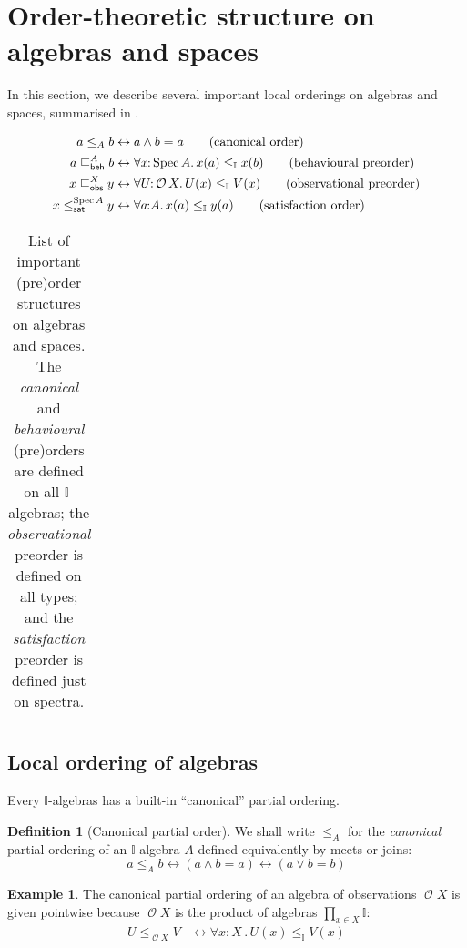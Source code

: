 \documentclass[a4paper,12pt]{amsart}
\theoremstyle{definition}
\newtheorem{example}[theorem]{Example}
\newtheorem{definition}[theorem]{Definition}
\newcommand{\mc}[1]{\mathcal{#1}}
\newcommand{\mbb}[1]{\mathbb{#1}}
\newcommand{\I}{\mbb I}
\newcommand{\fa}[2]{\forall #1\!\colon\!\!#2\mathpunct{.}}
\newcommand{\eq}{\leftrightarrow}
\newcommand{\spec}{\operatorname{Spec}}
\newcommand{\opens}{\operatorname{\mc{O}}} %
\begin{document}
\section{Order-theoretic structure on algebras and spaces}\label{sec:order-theoretic-structure}

In this section, we describe several important local orderings on algebras and spaces, summarised in .

\begin{table}[ht]
  \begin{align*}
    a\le_A b &\eq a\wedge b = a
    \tag{canonical order}
    \\
    a\behle[A]b &\eq 
    \fa{x}{\spec{A}}x(a)\le_\I x(b)
    \tag{behavioural preorder}
    \\
    x\obsle[X]y &\eq \fa{U}{\opens{X}} U(x)\le_\I V(x)
    \tag{observational preorder}
    \\ 
    x\satle[\spec{A}]y &\eq \fa{a}{A} x(a)\le_\I y(a)
    \tag{satisfaction order}
  \end{align*}
  \begin{tabular}{ll}
  \end{tabular}
  \caption{List of important (pre)order structures on algebras and spaces. The \emph{canonical} and \emph{behavioural} (pre)orders are defined on all $\I$-algebras; the \emph{observational} preorder is defined on all types; and the \emph{satisfaction} preorder is defined just on spectra.}
  \label{table:orders}
\end{table}


\subsection{Local ordering of algebras}

Every $\I$-algebras has a built-in ``canonical'' partial ordering.

\begin{definition}[Canonical partial order]
  We shall write $\le_A$ for the \emph{canonical} partial ordering of an $\I$-algebra $A$ defined equivalently by meets or joins:
  \[ 
    a\le_A b \eq (a\wedge b = a) \eq (a\vee b = b)
  \]
\end{definition}

\begin{example}
  The canonical partial ordering of an algebra of observations $\opens{X}$ is given pointwise because $\opens{X}$ is the product of algebras $\prod_{x\in X}\I$:
  \begin{align*}
    U\le_{\opens{X}} V 
    &\eq \fa{x}{X} U(x)\le_\I V(x)
  \end{align*}
\end{example}
\end{document}
